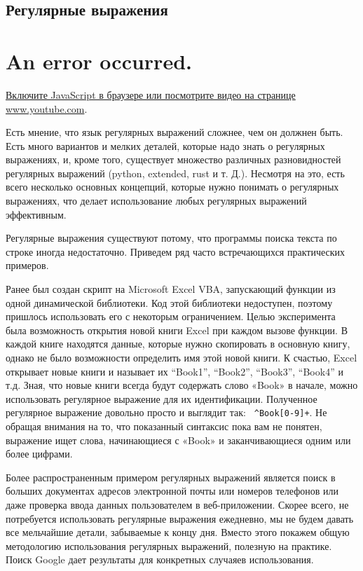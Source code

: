 \documentclass{report}
\begin{document}
\hypertarget{Regular-Expressions}{%
\subsection{\texorpdfstring{\protect\hyperlink{Regular-Expressions}{}Регулярные
выражения}{Регулярные выражения}}\label{Regular-Expressions}}

\hypertarget{player}{}

\hypertarget{an-error-occurred.}{%
\section{An error occurred.}\label{an-error-occurred.}}

\href{https://www.youtube.com/watch?v=NhcaKdt3NdM}{Включите JavaScript в
браузере или посмотрите видео на странице www.youtube.com}.

Есть мнение, что язык регулярных выражений сложнее, чем он должнен быть.
Есть много вариантов и мелких деталей, которые надо знать о регулярных
выражениях, и, кроме того, существует множество различных разновидностей
регулярных выражений (python, extended, rust и т. Д.). Несмотря на это,
есть всего несколько основных концепций, которые нужно понимать о
регулярных выражениях, что делает использование любых регулярных
выражений эффективным.

Регулярные выражения существуют потому, что программы поиска текста по
строке иногда недостаточно. Приведем ряд часто встречающихся
практических примеров.

Ранее был создан скрипт на Microsoft Excel VBA, запускающий функции из
одной динамической библиотеки. Код этой библиотеки недоступен, поэтому
пришлось использовать его с некоторым ограничением. Целью эксперимента
была возможность открытия новой книги Excel при каждом вызове функции. В
каждой книге находятся данные, которые нужно скопировать в основную
книгу, однако не было возможности определить имя этой новой книги. К
счастью, Excel открывает новые книги и называет их ``Book1'', ``Book2'',
``Book3'', ``Book4'' и т.д. Зная, что новые книги всегда будут содержать
слово «Book» в начале, можно использовать регулярное выражение для их
идентификации. Полученное регулярное выражение довольно просто и
выглядит так: \texttt{\ \^{}Book{[}0-9{]}+}. Не обращая внимания на то,
что показанный синтаксис пока вам не понятен, выражение ищет слова,
начинающиеся с «Book» и заканчивающиеся одним или более цифрами.

Более распространенным примером регулярных выражений является поиск в
больших документах адресов электронной почты или номеров телефонов или
даже проверка ввода данных пользователем в веб-приложении. Скорее всего,
не потребуется использовать регулярные выражения ежедневно, мы не будем
давать все мельчайшие детали, забываемые к концу дня. Вместо этого
покажем общую методологию использования регулярных выражений, полезную
на практике. Поиск Google дает результаты для конкретных случаяев
использования.
\end{document}
